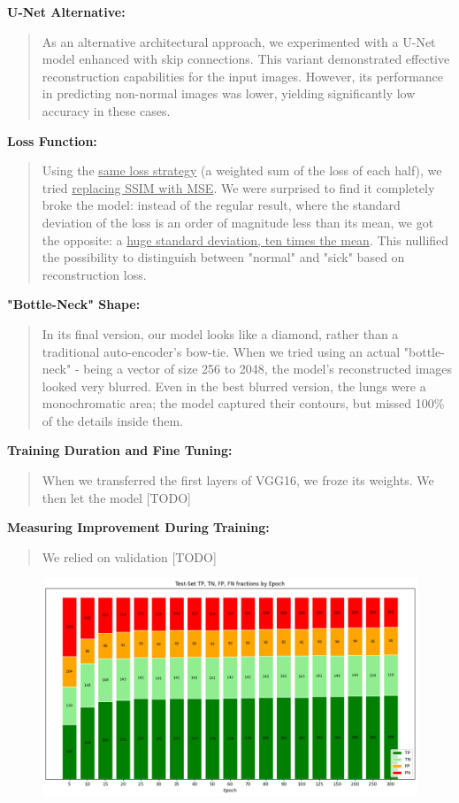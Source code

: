 \documentclass{article}
\begin{document}
\textbf{U-Net Alternative:}
\begin{quote}
As an alternative architectural approach, we experimented with a U-Net model enhanced with skip connections. This variant demonstrated effective reconstruction capabilities for the input images. However, its performance in predicting non-normal images was lower, yielding significantly low accuracy in these cases.
\end{quote}

\textbf{Loss Function:} 
\begin{quote}
Using the \uline{same loss strategy} (a weighted sum of the loss of each half), we tried \uline{replacing SSIM with MSE}. We were surprised to find it completely broke the model: instead of the regular result, where the standard deviation of the loss is an order of magnitude less than its mean, we got the opposite: a \uline{huge standard deviation, ten times the mean}. This nullified the possibility to distinguish between "normal" and "sick" based on reconstruction loss.
\end{quote}

\textbf{"Bottle-Neck" Shape:} 
\begin{quote}
In its final version, our model looks like a diamond, rather than a traditional auto-encoder's bow-tie. When we tried using an actual "bottle-neck" - being a vector of size 256 to 2048, the model's reconstructed images looked very blurred. Even in the best blurred version, the lungs were a monochromatic area; the model captured their contours, but missed 100\% of the details inside them.
\end{quote}

\textbf{Training Duration and Fine Tuning:}
\begin{quote}
When we transferred the first layers of VGG16, we froze its weights. We then let the model [TODO]
\end{quote}


\textbf{Measuring Improvement During Training:}
\begin{quote}
We relied on validation [TODO]
\end{quote}

\begin{figure}[H]
  \centering
  \includegraphics[width=1\linewidth]{confusion_by_epoch.png}
\end{figure}
\end{document}
